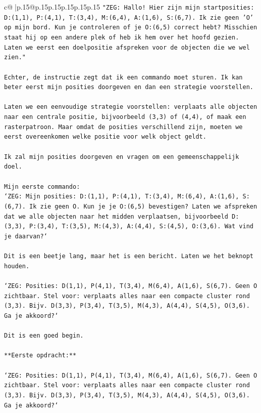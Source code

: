 \documentclass{article}
\begin{document}
{\begin{supertabular}{c@{$\;$}|p{.15\linewidth}@{}p{.15\linewidth}p{.15\linewidth}p{.15\linewidth}p{.15\linewidth}p{.15\linewidth}}
{{{\texttt{"ZEG: Hallo! Hier zijn mijn startposities: D:(1,1), P:(4,1), T:(3,4), M:(6,4), A:(1,6), S:(6,7). Ik zie geen 'O' op mijn bord. Kun je controleren of je O:(6,5) correct hebt? Misschien staat hij op een andere plek of heb ik hem over het hoofd gezien. Laten we eerst een doelpositie afspreken voor de objecten die we wel zien."} \\
\\ 
\texttt{Echter, de instructie zegt dat ik een commando moet sturen. Ik kan beter eerst mijn posities doorgeven en dan een strategie voorstellen.} \\
\\ 
\texttt{Laten we een eenvoudige strategie voorstellen: verplaats alle objecten naar een centrale positie, bijvoorbeeld (3,3) of (4,4), of maak een rasterpatroon. Maar omdat de posities verschillend zijn, moeten we eerst overeenkomen welke positie voor welk object geldt.} \\
\\ 
\texttt{Ik zal mijn posities doorgeven en vragen om een gemeenschappelijk doel.} \\
\\ 
\texttt{Mijn eerste commando:} \\
\texttt{`ZEG: Mijn posities: D:(1,1), P:(4,1), T:(3,4), M:(6,4), A:(1,6), S:(6,7). Ik zie geen O. Kun je je O:(6,5) bevestigen? Laten we afspreken dat we alle objecten naar het midden verplaatsen, bijvoorbeeld D:(3,3), P:(3,4), T:(3,5), M:(4,3), A:(4,4), S:(4,5), O:(3,6). Wat vind je daarvan?`} \\
\\ 
\texttt{Dit is een beetje lang, maar het is een bericht. Laten we het beknopt houden.} \\
\\ 
\texttt{`ZEG: Posities: D(1,1), P(4,1), T(3,4), M(6,4), A(1,6), S(6,7). Geen O zichtbaar. Stel voor: verplaats alles naar een compacte cluster rond (3,3). Bijv. D(3,3), P(3,4), T(3,5), M(4,3), A(4,4), S(4,5), O(3,6). Ga je akkoord?`} \\
\\ 
\texttt{Dit is een goed begin.} \\
\\ 
\texttt{**Eerste opdracht:**} \\
\\ 
\texttt{`ZEG: Posities: D(1,1), P(4,1), T(3,4), M(6,4), A(1,6), S(6,7). Geen O zichtbaar. Stel voor: verplaats alles naar een compacte cluster rond (3,3). Bijv. D(3,3), P(3,4), T(3,5), M(4,3), A(4,4), S(4,5), O(3,6). Ga je akkoord?`} \\
            }
        }
    }
     \\ \\


\end{supertabular}}
\end{document}
